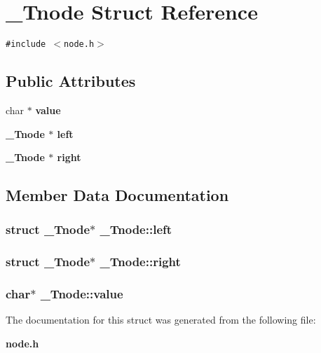 \section{\_\-Tnode Struct Reference}
\label{struct__Tnode}
{\tt \#include $<$node.h$>$}

\subsection*{Public Attributes}
\begin{CompactItemize}
\item 
char $\ast$ \bf{value}
\item 
\bf{\_\-Tnode} $\ast$ \bf{left}
\item 
\bf{\_\-Tnode} $\ast$ \bf{right}
\end{CompactItemize}


\subsection{Member Data Documentation}
\subsubsection{\setlength{\rightskip}{0pt plus 5cm}struct \bf{\_\-Tnode}$\ast$ \bf{\_\-Tnode::left}}\label{struct__Tnode_e0bc2a528087668b5b26fa8eae92b083}


\subsubsection{\setlength{\rightskip}{0pt plus 5cm}struct \bf{\_\-Tnode}$\ast$ \bf{\_\-Tnode::right}}\label{struct__Tnode_ca790968bedd7a3d516fcb627f8ea07b}


\subsubsection{\setlength{\rightskip}{0pt plus 5cm}char$\ast$ \bf{\_\-Tnode::value}}\label{struct__Tnode_374c5893b3e5c8ca5226bbe371b2343c}




The documentation for this struct was generated from the following file:\begin{CompactItemize}
\item 
\bf{node.h}\end{CompactItemize}
